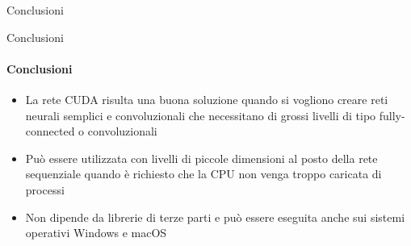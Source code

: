 \documentclass[
 ]{beamer}
\begin{document}
\begin{frame}[c]
  \centering
  \bigskip \bigskip    
  \Huge Conclusioni
\end{frame}

\begin{frame}{Conclusioni}
    \framesubtitle{Conclusioni}
    \smallskip
    \begin{itemize} [<+->]
        \setlength\itemsep{3em}
        \item \large La rete CUDA risulta una buona soluzione quando si vogliono creare reti neurali semplici e convoluzionali che necessitano di grossi livelli di tipo fully-connected o convoluzionali
        \item \large Può essere utilizzata con livelli di piccole dimensioni al posto della rete sequenziale quando è richiesto che la CPU non venga troppo caricata di processi
        \item \large Non dipende da librerie di terze parti e può essere eseguita anche sui sistemi operativi Windows e macOS
    \end{itemize}     
\end{frame}
\end{document}
